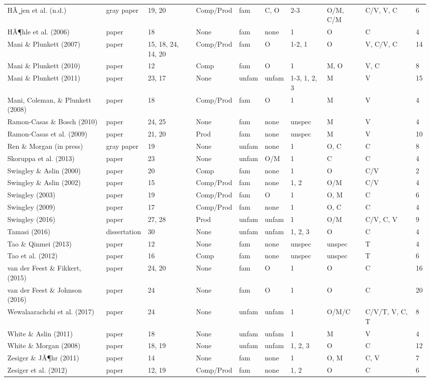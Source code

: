 \documentclass[
  english,
  man, noextraspace]{apa6}
\newenvironment{lltable}{\begin{landscape}\begin{center}\begin{ThreePartTable}}{\end{ThreePartTable}\end{center}\end{landscape}}
\begin{document}
\begin{lltable}
{\begin{longtable}{llllllllll}
HÃ¸jen et al. (n.d.) & gray paper & 19, 20 & Comp/Prod & fam & C, O & 2-3 & O/M, C/M & C/V, V, C & 6\\
HÃ¶hle et al. (2006) & paper & 18 & None & fam & none & 1 & O & C & 4\\
Mani \& Plunkett (2007) & paper & 15, 18, 24, 14, 20 & Comp/Prod & fam & O & 1-2, 1 & O & V, C/V, C & 14\\
Mani \& Plunkett (2010) & paper & 12 & Comp & fam & O & 1 & M, O & V, C & 8\\
Mani \& Plunkett (2011) & paper & 23, 17 & None & unfam & unfam & 1-3, 1, 2, 3 & M & V & 15\\
Mani, Coleman, \& Plunkett (2008) & paper & 18 & Comp/Prod & fam & O & 1 & M & V & 4\\
Ramon-Casas \& Bosch (2010) & paper & 24, 25 & None & fam & none & unspec & M & V & 4\\
Ramon-Casas et al. (2009) & paper & 21, 20 & Prod & fam & none & unspec & M & V & 10\\
Ren \& Morgan (in press) & gray paper & 19 & None & unfam & none & 1 & O, C & C & 8\\
Skoruppa et al. (2013) & paper & 23 & None & unfam & O/M & 1 & C & C & 4\\
Swingley \& Aslin (2000) & paper & 20 & Comp & fam & none & 1 & O & C/V & 2\\
Swingley \& Aslin (2002) & paper & 15 & Comp/Prod & fam & none & 1, 2 & O/M & C/V & 4\\
Swingley (2003) & paper & 19 & Comp/Prod & fam & O & 1 & O, M & C & 6\\
Swingley (2009) & paper & 17 & Comp/Prod & fam & none & 1 & O, C & C & 4\\
Swingley (2016) & paper & 27, 28 & Prod & unfam & unfam & 1 & O/M & C/V, C, V & 9\\
Tamasi (2016) & dissertation & 30 & None & unfam & unfam & 1, 2, 3 & O & C & 4\\
Tao \& Qinmei (2013) & paper & 12 & None & fam & none & unspec & unspec & T & 4\\
Tao et al. (2012) & paper & 16 & Comp & fam & none & unspec & unspec & T & 6\\
van der Feest \& Fikkert, (2015) & paper & 24, 20 & None & fam & O & 1 & O & C & 16\\
van der Feest \& Johnson (2016) & paper & 24 & None & fam & O & 1 & O & C & 20\\
Wewalaarachchi et al. (2017) & paper & 24 & None & unfam & unfam & 1 & O/M/C & C/V/T, V, C, T & 8\\
White \& Aslin (2011) & paper & 18 & None & unfam & unfam & 1 & M & V & 4\\
White \& Morgan (2008) & paper & 18, 19 & None & unfam & unfam & 1, 2, 3 & O & C & 12\\
Zesiger \& JÃ¶hr (2011) & paper & 14 & None & fam & none & 1 & O, M & C, V & 7\\
Zesiger et al. (2012) & paper & 12, 19 & Comp/Prod & fam & none & 1, 2 & O & C & 6\\
\bottomrule
\end{longtable}

}
\end{lltable}
\end{document}
